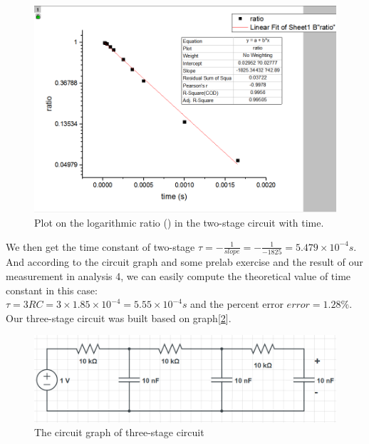 \begin{figure}[!htbp]
	\centering %
	\includegraphics[width=\linewidth]{images/2_6.PNG} %
	\caption{Plot on the logarithmic ratio ({\tiny }) in the two-stage circuit with time.} %
	\label{fig:2.6} %
\end{figure}

\phantom{ } We then get the time constant of two-stage 
$\tau = -\frac{1}{slope} = -\frac{1}{-1825} = 5.479\times10^{-4}s $.\\ And according to the circuit graph and some prelab exercise and the result of our measurement in analysis 4, we can easily compute
the theoretical value of time constant in this case:\\
$\tau = 3RC = 3\times1.85\times10^{-4} = 5.55\times10^{-4}s$ and the percent error $error = 1.28\%$.\\
\phantom{ } Our three-stage circuit was built based on graph[\ref{fig:2.4}].\\

\begin{figure}[!htbp]
	\centering %
	\includegraphics[width=\linewidth]{images/2_4.PNG} %
	\caption{The circuit graph of three-stage circuit} %
	\label{fig:2.4} %
\end{figure}


